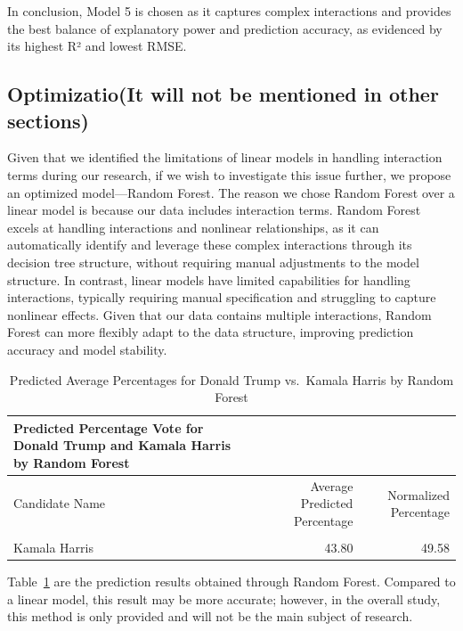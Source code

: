 \documentclass[
  letterpaper,
  DIV=11,
  numbers=noendperiod]{scrartcl}
\begin{document}
In conclusion, Model 5 is chosen as it captures complex interactions and
provides the best balance of explanatory power and prediction accuracy,
as evidenced by its highest R² and lowest RMSE.

\hypertarget{optimizatioit-will-not-be-mentioned-in-other-sections}{%
\subsection{Optimizatio(It will not be mentioned in other
sections)}\label{optimizatioit-will-not-be-mentioned-in-other-sections}}

Given that we identified the limitations of linear models in handling
interaction terms during our research, if we wish to investigate this
issue further, we propose an optimized model---Random Forest. The reason
we chose Random Forest over a linear model is because our data includes
interaction terms. Random Forest excels at handling interactions and
nonlinear relationships, as it can automatically identify and leverage
these complex interactions through its decision tree structure, without
requiring manual adjustments to the model structure. In contrast, linear
models have limited capabilities for handling interactions, typically
requiring manual specification and struggling to capture nonlinear
effects. Given that our data contains multiple interactions, Random
Forest can more flexibly adapt to the data structure, improving
prediction accuracy and model stability.

\hypertarget{tbl-rf}{}
\begin{longtable}[t]{lrr}
\caption{\label{tbl-rf}Predicted Average Percentages for Donald Trump vs.~Kamala Harris by
Random Forest }Predicted Percentage Vote for Donald Trump and Kamala Harris by Random Forest}\\
\toprule
Candidate Name & Average Predicted Percentage & Normalized Percentage\\
\midrule
\cellcolor{gray!10}{Donald Trump} & \cellcolor{gray!10}{44.54} & \cellcolor{gray!10}{50.42}\\
Kamala Harris & 43.80 & 49.58\\
\bottomrule
\end{longtable}

Table~\ref{tbl-rf} are the prediction results obtained through Random
Forest. Compared to a linear model, this result may be more accurate;
however, in the overall study, this method is only provided and will not
be the main subject of research.
\end{document}
